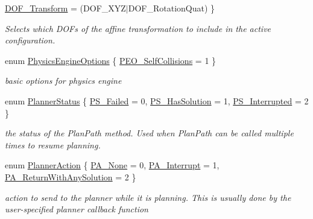 \begin{DoxyCompactItemize}
\par
\hyperlink{namespaceOpenRAVE_a3016e2185103f3c1bdc5e4482893ca98a7dc89bc3eae094319fe037d302928916}{DOF\_\-Transform} =  (DOF\_\-XYZ$|$DOF\_\-RotationQuat)
 \}
\begin{DoxyCompactList}\small\item\em Selects which DOFs of the affine transformation to include in the active configuration. \item\end{DoxyCompactList}\item 
enum \hyperlink{namespaceOpenRAVE_a5ab12d9ae992912f730cfefda6c97042}{PhysicsEngineOptions} \{ \hyperlink{namespaceOpenRAVE_a5ab12d9ae992912f730cfefda6c97042ac6a259c2e3176f579d27d30003166e17}{PEO\_\-SelfCollisions} =  1
 \}
\begin{DoxyCompactList}\small\item\em basic options for physics engine \item\end{DoxyCompactList}\item 
enum \hyperlink{namespaceOpenRAVE_a7cead738b92cbe2f332dea20dd2f200e}{PlannerStatus} \{ \hyperlink{namespaceOpenRAVE_a7cead738b92cbe2f332dea20dd2f200ea46d7da834c9c074260b53909874e4b38}{PS\_\-Failed} =  0, 
\hyperlink{namespaceOpenRAVE_a7cead738b92cbe2f332dea20dd2f200ea23c3ecb52bc33b330da0f5a4441115e5}{PS\_\-HasSolution} =  1, 
\hyperlink{namespaceOpenRAVE_a7cead738b92cbe2f332dea20dd2f200ea6130a9f38faec3533a7d0e5594d4ef10}{PS\_\-Interrupted} =  2
 \}
\begin{DoxyCompactList}\small\item\em the status of the PlanPath method. Used when PlanPath can be called multiple times to resume planning. \item\end{DoxyCompactList}\item 
enum \hyperlink{namespaceOpenRAVE_a16104fe58cdf1075c47eb709e58ba853}{PlannerAction} \{ \hyperlink{namespaceOpenRAVE_a16104fe58cdf1075c47eb709e58ba853a64ec1b874d3088ceef9bd5051c65889f}{PA\_\-None} = 0, 
\hyperlink{namespaceOpenRAVE_a16104fe58cdf1075c47eb709e58ba853a39d503ce662ac46ebdb9fc6e55ca7a5a}{PA\_\-Interrupt} = 1, 
\hyperlink{namespaceOpenRAVE_a16104fe58cdf1075c47eb709e58ba853adcf80ca3a0125b7e5de795d605ab7ffe}{PA\_\-ReturnWithAnySolution} = 2
 \}
\begin{DoxyCompactList}\small\item\em action to send to the planner while it is planning. This is usually done by the user-\/specified planner callback function \item\end{DoxyCompactList}\item 

\end{DoxyCompactItemize}
